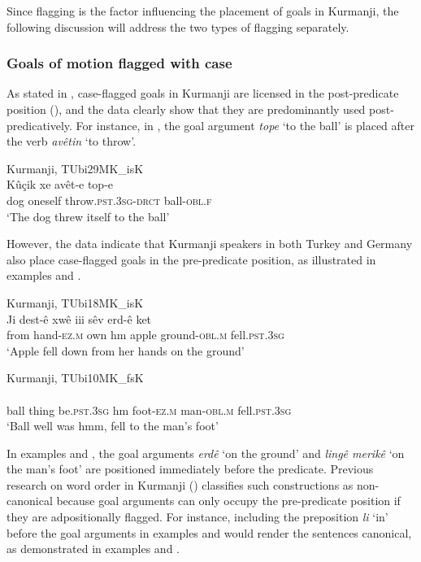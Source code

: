 Since flagging is the factor influencing the placement of goals in Kurmanji, the following discussion will address the two types of flagging separately.

\subsubsection{Goals of motion flagged with case}\label{sec:key:6.3.1.1}

As stated in , case-flagged goals in Kurmanji are licensed in the post-predicate position (\citealt{Haig2014, Haig2018, Gundogdu2019}), and the data clearly show that they are predominantly used post-predicatively. For instance, in , the goal argument \textit{tope} ‘to the ball’ is placed after the verb \textit{avêtin} ‘to throw’.

\ea%
  \label{ex:key:55} Kurmanji, TUbi29MK\_isK \\
\gll Kûçik   xe     avêt-e       top-e \\
dog  oneself    throw.\textsc{pst.3sg}-\textsc{drct}  ball-\textsc{obl.f}\\
\glt ‘The dog threw itself to the ball’ 
  \z

However, the data indicate that Kurmanji speakers in both Turkey and Germany also place case-flagged goals in the pre-predicate position, as illustrated in examples  and .

\ea%
  \label{ex:key:56} Kurmanji,  TUbi18MK\_isK \\
\gll Ji   dest-ê     xwê   iii   sêv   erd-ê     ket\\
from  hand\textsc{-ez.m}   own  hm  apple   ground\textsc{-obl.m} fell.\textsc{pst.3sg}\\
\glt ‘Apple fell down from her hands on the ground’
  \z

\ea%
  \label{ex:key:57} Kurmanji, TUbi10MK\_fsK \\
\\
ball  thing   be.\textsc{pst.3sg}  hm  {} foot-\textsc{ez.m}  man-\textsc{obl.m}  fell.\textsc{pst.3sg}\\
\glt ‘Ball well was hmm, fell to the man’s foot’  
  \z

In examples  and , the goal arguments \textit{erdê} `on the ground' and \textit{lingê merikê} `on the man's foot' are positioned immediately before the predicate. Previous research on word order in Kurmanji (\citealt{Haig2014, Haig2018, Gundogdu2019}) classifies such constructions as non-canonical because goal arguments can only occupy the pre-predicate position if they are adpositionally flagged. For instance, including the preposition \textit{li} `in' before the goal arguments in examples  and  would render the sentences canonical, as demonstrated in examples  and .


